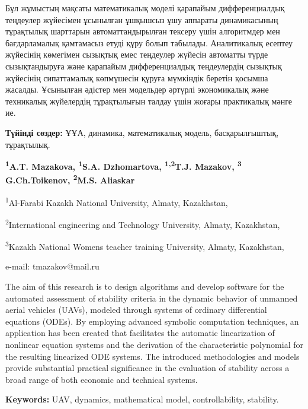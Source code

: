 Бұл жұмыстың мақсаты математикалық моделі қарапайым дифференциалдық
теңдеулер жүйесімен ұсынылған ұшқышсыз ұшу аппараты динамикасының
тұрақтылық шарттарын автоматтандырылған тексеру үшін алгоритмдер мен
бағдарламалық қамтамасыз етуді құру болып табылады. Аналитикалық есептеу
жүйесінің көмегімен сызықтық емес теңдеулер жүйесін автоматты түрде
сызықтандыруға және қарапайым дифференциалдық теңдеулердің сызықтық
жүйесінің сипаттамалық көпмүшесін құруға мүмкіндік беретін қосымша
жасалды. Ұсынылған әдістер мен модельдер әртүрлі экономикалық және
техникалық жүйелердің тұрақтылығын талдау үшін жоғары практикалық мәнге
ие.

{\bfseries Түйінді сөздер:} ҰҰА, динамика, математикалық модель,
басқарылғыштық, тұрақтылық.



\begin{center}
{\bfseries \textsuperscript{1}A.T. Mazakova,
\textsuperscript{1}S.A. Dzhomartova, \textsuperscript{1,2}T.J.
Mazakov\envelope, \textsuperscript{3} G.Ch.Toikenov, \textsuperscript{2}M.S. Aliaskar}

\textsuperscript{1}Al-Farabi Kazakh National University, Almaty,
Kazakhstan,

\textsuperscript{2}International engineering and Technology University,
Almaty, Kazakhstan,

\textsuperscript{3}Kazakh National Women\textquotesingle s teacher
training University, Almaty, Kazakhstan,

e-mail: tmazakov@mail.ru
\end{center}

The aim of this research is to design algorithms and develop software
for the automated assessment of stability criteria in the dynamic
behavior of unmanned aerial vehicles (UAVs), modeled through systems of
ordinary differential equations (ODEs). By employing advanced symbolic
computation techniques, an application has been created that facilitates
the automatic linearization of nonlinear equation systems and the
derivation of the characteristic polynomial for the resulting linearized
ODE systems. The introduced methodologies and models provide substantial
practical significance in the evaluation of stability across a broad
range of both economic and technical systems.

{\bfseries Keywords:} UAV, dynamics, mathematical model, controllability,
stability.

